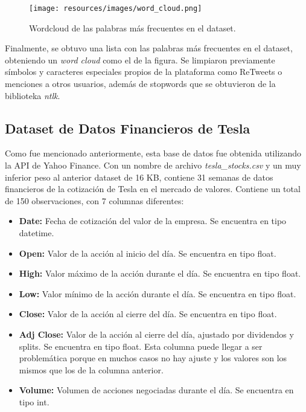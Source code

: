 \documentclass[a4paper, 12pt]{report}
\begin{document}
                        \begin{figure}[H]
                                \centering
                                \texttt{[image: resources/images/word\_cloud.png]}
                                \caption{Wordcloud de las palabras más frecuentes en el dataset.}
                                \label{fig:wordcloud}
                        \end{figure}

                        Finalmente, se obtuvo una lista con las palabras más frecuentes en el dataset, obteniendo un \textit{word cloud} como el de la figura. Se limpiaron previamente símbolos y caracteres especiales propios de la plataforma como ReTweets o menciones a otros usuarios,
                         además de stopwords que se obtuvieron de la biblioteka \textit{ntlk}.\\


                \subsection{Dataset de Datos Financieros de Tesla}

                        Como fue mencionado anteriormente, esta base de datos fue obtenida utilizando la API de Yahoo Finance. Con un nombre de archivo \textit{tesla\_stocks.csv} y un muy inferior peso al anterior dataset de 16 KB,
                        contiene 31 semanas de datos financieros de la cotización de Tesla en el mercado de valores. Contiene un total de 150 observaciones, con 7 columnas diferentes:\\

                        \begin{itemize}
                                \item \textbf{Date:} Fecha de cotización del valor de la empresa. Se encuentra en tipo datetime.
                                \item \textbf{Open:} Valor de la acción al inicio del día. Se encuentra en tipo float.
                                \item \textbf{High:} Valor máximo de la acción durante el día. Se encuentra en tipo float.
                                \item \textbf{Low:} Valor mínimo de la acción durante el día. Se encuentra en tipo float.
                                \item \textbf{Close:} Valor de la acción al cierre del día. Se encuentra en tipo float.
                                \item \textbf{Adj Close:} Valor de la acción al cierre del día, ajustado por dividendos y splits. Se encuentra en tipo float. Esta columna puede llegar a ser problemática porque en muchos casos no hay ajuste y los valores son los mismos que los de la columna anterior.
                                \item \textbf{Volume:} Volumen de acciones negociadas durante el día. Se encuentra en tipo int.
                        \end{itemize}
\end{document}
